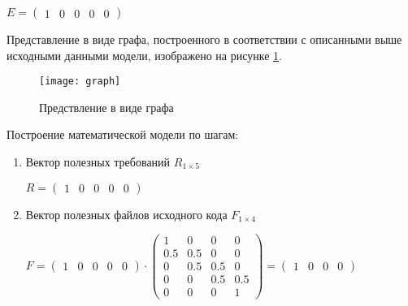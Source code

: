 \begin{center}
  $
  E = \begin{pmatrix}
    1 & 0 & 0 & 0 & 0
  \end{pmatrix}
  $
\end{center}

Представление в виде графа, построенного в соответствии с описанными выше исходными данными модели, изображено на рисунке \ref{fig:graph}.

\begin{figure}[H]
  \centering
  \texttt{[image: graph]}
  \caption{Предствление в виде графа}
  \label{fig:graph}
\end{figure}

Построение математической модели по шагам:
\begin{enumerate}
  \item Вектор полезных требований $R_{1 \times 5}$
  \begin{center}
    $
      R = 
      \begin{pmatrix}
        1 & 0 & 0 & 0 & 0
      \end{pmatrix}
    $
  \end{center}
  
  \item Вектор полезных файлов исходного кода $F_{1 \times 4}$
  \begin{center}
    $
      F = 
      \begin{pmatrix}
        1 & 0 & 0 & 0 & 0
      \end{pmatrix}
      \cdot
      \begin{pmatrix}
        1 &   0 &   0 & 0   \\
      0.5 & 0.5 &   0 & 0   \\
        0 & 0.5 & 0.5 & 0   \\
        0 &   0 & 0.5 & 0.5 \\
        0 &   0 &   0 & 1 
    \end{pmatrix}
    = \begin{pmatrix}
        1 & 0 & 0 & 0
      \end{pmatrix}
    $
  \end{center}
  

\end{enumerate}
